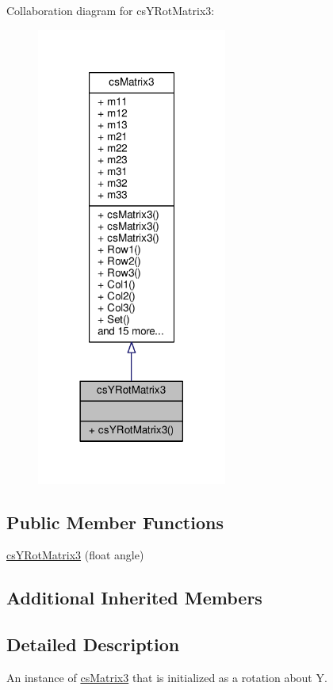 Collaboration diagram for cs\+Y\+Rot\+Matrix3\+:
\nopagebreak
\begin{figure}[H]
\begin{center}
\leavevmode
\includegraphics[width=177pt]{d5/dec/classcsYRotMatrix3__coll__graph}
\end{center}
\end{figure}
\subsection*{Public Member Functions}
\begin{DoxyCompactItemize}
\item 
\hyperlink{classcsYRotMatrix3_a765b63f20ab51766a1b79150c9c40a50}{cs\+Y\+Rot\+Matrix3} (float angle)
\end{DoxyCompactItemize}
\subsection*{Additional Inherited Members}


\subsection{Detailed Description}
An instance of \hyperlink{classcsMatrix3}{cs\+Matrix3} that is initialized as a rotation about Y. 

